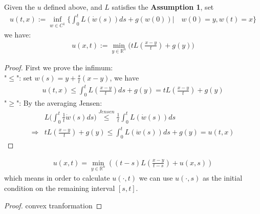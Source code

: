 \begin{lemma}
	Given the $u$ defined above, and $L$ satisfies the \textbf{Assumption 1}, set
\begin{align*}
	u(t, x) := \inf_{w \in C^1} \bigg\{ \int_0^t L(\dot{w}(s) ) ds + g(w(0)) \bigg| \quad w(0) = y, w(t) = x\bigg\}
\end{align*}
we have:
\begin{align*}
		u(x, t):= \min_{y \in \mathbb{R}^n} \bigg(t L(\frac{x - y}{t}) + g(y)\bigg)
\end{align*}
\end{lemma}
\begin{proof}
First we prove the infimum:\\
"$\leq$": set $w(s) = y + \frac{s}{t}(x - y)$, we have
\begin{align*}
	u(t, x) \le \int_0^t L(\frac{x - y}{t})ds + g(y) = t L(\frac{x - y}{t}) + g(y)
\end{align*}
"$\geq$": By the averaging Jensen:
\begin{align*}
	 &L\bigg(\int_0^t \frac{1}{t} \dot{w}(s) ds \bigg) \overset{Jensen}{\le} \frac{1}{t} \int_0^t L(\dot{w}(s))ds  \\
	 \Rightarrow
	 & t L(\frac{x - y}{t}) + g(y) \le \int_0^t L(\dot{w}(s))ds + g(y) = u(t, x)
\end{align*}
\end{proof}

\begin{lemma}
	\begin{align*}
		u(x, t) = \min_{y \in \mathbb{R}^n} ((t-s)L(\frac{x - y}{t - s}) + u(x, s)) 
	\end{align*}
	which means in order to calculate $u( \cdot, t)$ we can use $u( \cdot, s)$ as the initial condition on the remaining interval $[s, t]$. 
\end{lemma}
\begin{proof}
	convex tranformation
\end{proof}
	

